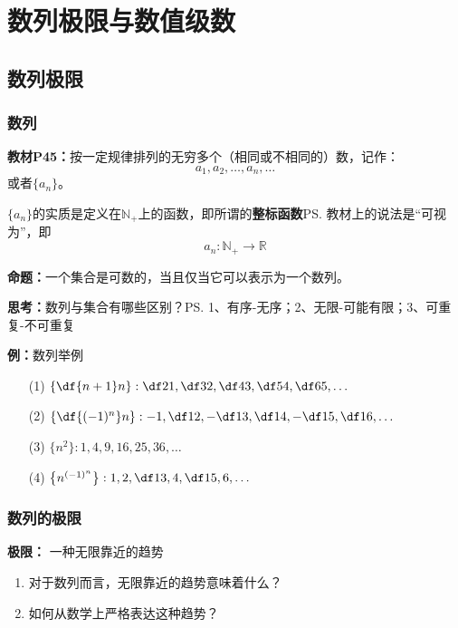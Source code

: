\setcounter{chapter}{1}

\chapter{数列极限与数值级数}

\section{数列极限}

\subsection{数列}

{\bf 教材P45：}按一定规律排列的无穷多个（相同或不相同的）数，记作：
$$a_1,a_2,\ldots,a_n,\ldots$$
或者$\{a_n\}$。

$\{a_n\}$的实质是定义在$\mathbb{N}_+$上的函数，即所谓的{\bf 整标函数}\ps{教材上的说法是“可视为”}，即
$$a_n:\mathbb{N}_+\to\mathbb{R}$$

{\bf 命题：}一个集合是可数的，当且仅当它可以表示为一个数列。

{\bf 思考：}数列与集合有哪些区别？\ps{1、有序-无序；2、无限-可能有限；3、可重复-不可重复}

{\bf 例：}数列举例

\begin{enumerate}[(1)]
  \setlength{\itemindent}{1cm}
  \item[(1)] $\left\{\df{n+1}n\right\}:\df 21,\df 32,\df43,\df54,\df65,\ldots$
  \item[(2)] $\left\{\df{(-1)^n}n\right\}:-1,\df12,-\df13,\df14,-\df15,\df16,\ldots$
  \item[(3)] $\{n^2\}:1,4,9,16,25,36,\ldots$
  \item[(4)] $\left\{n^{(-1)^n}\right\}:1,2,\df13,4,\df15,6,\ldots$
\end{enumerate}

\subsection{数列的极限}

{\bf 极限：} 一种无限靠近的趋势 
	
\begin{enumerate}
  \setlength{\itemindent}{1cm}
  \item 对于数列而言，无限靠近的趋势意味着什么？ 
  \item 如何从数学上严格表达这种趋势？ 
\end{enumerate}

